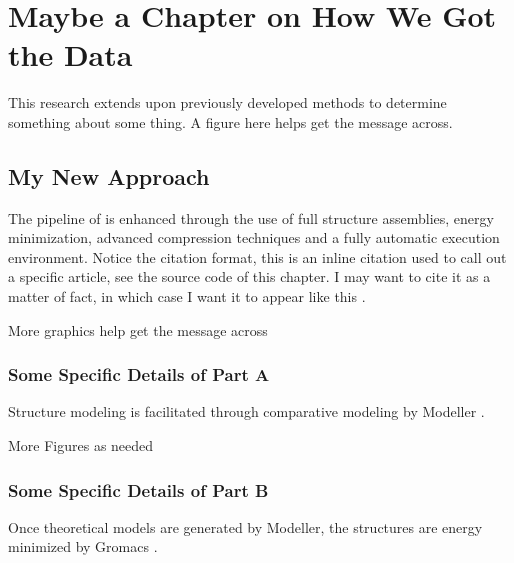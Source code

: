 \pagestyle{plain}
\chapter{Maybe a Chapter on How We Got the Data}
\renewcommand{\thetable}{\arabic{chapter}.\arabic{table}}  
\renewcommand{\thefigure}{\arabic{chapter}.\arabic{figure}} 

This research extends upon previously developed methods to determine something about some thing. A figure here helps get the message across.

\section{My New Approach}
The pipeline of \citet{Stieh2013} is enhanced through the use of full structure assemblies, energy minimization, advanced compression techniques and a fully automatic execution environment. Notice the citation format, this is an inline citation used to call out a specific article, see the source code of this chapter. I may want to cite it as a matter of fact, in which case I want it to appear like this \citep{Stieh2013}. 

More graphics help get the message across

\subsection{Some Specific Details of Part A}
Structure modeling is facilitated through comparative modeling by Modeller \citep{Sali1993}. 

More Figures as needed
\subsection{Some Specific Details of Part B}
Once theoretical models are generated by Modeller, the structures are energy minimized by Gromacs \citep{Berendsen1995, Lindahl2001}.

